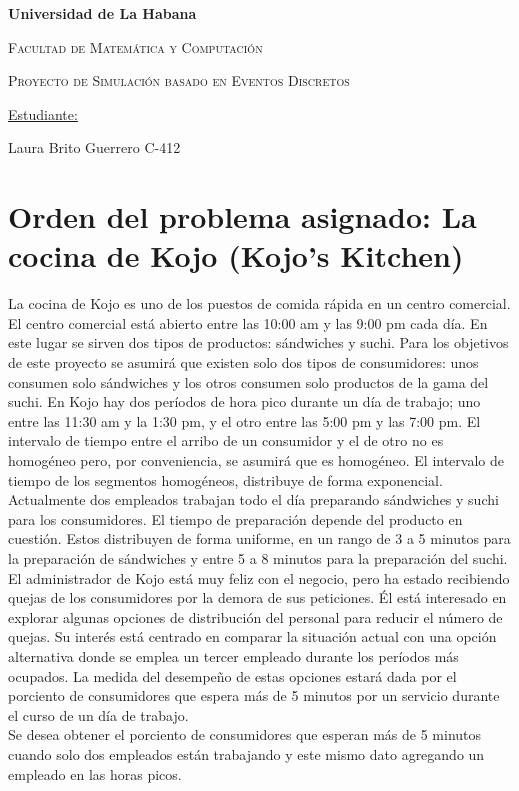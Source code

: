 \documentclass{book}
\begin{document}
	\begin{titlepage}
		\centering
		{\bfseries\LARGE Universidad de La Habana \par }
		\vspace{1cm}
		{\scshape\LARGE Facultad de Matem\'atica y Computaci\'on \par}
		\vspace{3cm}
		{\scshape\Huge Proyecto de Simulaci\'on basado en Eventos Discretos \par}
		\vspace{3cm}
		\vfill
		{\Large \underline{Estudiante:} \par}
		{\Large Laura Brito Guerrero C-412 \par}
		\vfill
	\end{titlepage}
	
	\section{Orden del problema asignado: La cocina de Kojo (Kojo's Kitchen)}	
	
		La cocina de Kojo es uno de los puestos de comida r\'apida en un centro comercial. El centro comercial est\'a abierto entre las 10:00 am y las 9:00 pm cada d\'ia. En este lugar se sirven dos tipos de productos: s\'andwiches y suchi. Para los objetivos de este proyecto se asumir\'a que existen solo dos tipos de consumidores: unos consumen solo s\'andwiches y los otros consumen solo productos de la gama del suchi. En Kojo hay dos per\'iodos de hora pico durante un d\'ia de trabajo; uno entre las 11:30 am y la 1:30 pm, y el otro entre las 5:00 pm y las 7:00 pm. El intervalo de tiempo entre el arribo de un consumidor y el de otro no es homog\'eneo pero, por conveniencia, se asumir\'a que es homog\'eneo. El intervalo de tiempo de los segmentos homog\'eneos, distribuye de forma exponencial. \\
		Actualmente dos empleados trabajan todo el d\'ia preparando s\'andwiches y suchi para los consumidores. El tiempo de preparaci\'on depende del producto en cuesti\'on. Estos distribuyen de forma uniforme, en un rango de 3 a 5 minutos para la preparaci\'on de s\'andwiches y entre 5 a 8 minutos para la preparaci\'on del suchi. \\
		El administrador de Kojo est\'a muy feliz con el negocio, pero ha estado recibiendo quejas de los consumidores por la demora de sus peticiones. \'El est\'a interesado en explorar algunas opciones de distribuci\'on del personal para reducir el n\'umero de quejas. Su inter\'es est\'a centrado en comparar la situaci\'on actual con una opci\'on alternativa donde se emplea un tercer empleado durante los per\'iodos m\'as ocupados. La medida del desempe\~no de estas opciones estar\'a dada por el porciento de consumidores que espera m\'as de 5 minutos por un servicio durante el curso de un d\'ia de trabajo. \\
		Se desea obtener el porciento de consumidores que esperan m\'as de 5 minutos cuando solo dos empleados est\'an trabajando y este mismo dato agregando un empleado en las horas picos.
		
\end{document}
